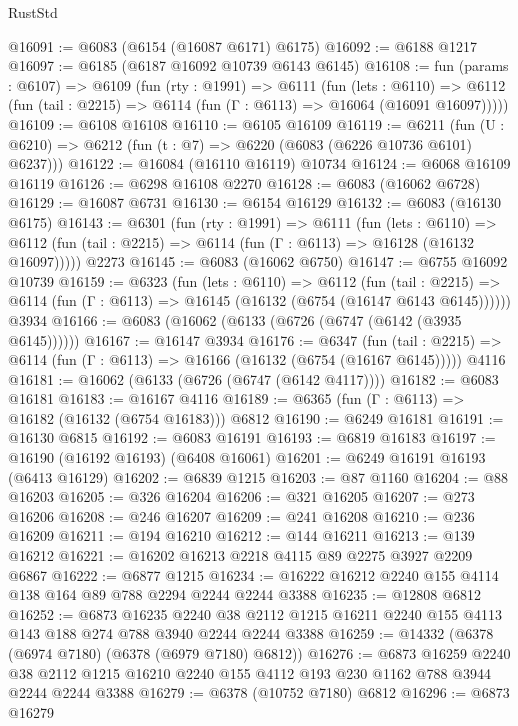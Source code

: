 \begin{lexlean}{RustStd}
\begin{coremodule}
@16091 := @6083 (@6154 (@16087 @6171) @6175)
@16092 := @6188 @1217
@16097 := @6185 (@6187 @16092 @10739 @6143 @6145)
@16108 := fun (params : @6107) =>
  @6109
    (fun (rty : @1991) =>
    @6111
      (fun (lets : @6110) =>
      @6112 (fun (tail : @2215) => @6114 (fun (Γ : @6113) => @16064 (@16091 @16097)))))
@16109 := @6108 @16108
@16110 := @6105 @16109
@16119 := @6211
    (fun (U : @6210) => @6212 (fun (t : @7) => @6220 (@6083 (@6226 @10736 @6101) @6237)))
@16122 := @16084 (@16110 @16119) @10734
@16124 := @6068 @16109 @16119
@16126 := @6298 @16108 @2270
@16128 := @6083 (@16062 @6728)
@16129 := @16087 @6731
@16130 := @6154 @16129
@16132 := @6083 (@16130 @6175)
@16143 := @6301
    (fun (rty : @1991) =>
    @6111
      (fun (lets : @6110) =>
      @6112 (fun (tail : @2215) => @6114 (fun (Γ : @6113) => @16128 (@16132 @16097)))))
    @2273
@16145 := @6083 (@16062 @6750)
@16147 := @6755 @16092 @10739
@16159 := @6323
    (fun (lets : @6110) =>
    @6112
      (fun (tail : @2215) =>
      @6114 (fun (Γ : @6113) => @16145 (@16132 (@6754 (@16147 @6143 @6145))))))
    @3934
@16166 := @6083 (@16062 (@6133 (@6726 (@6747 (@6142 (@3935 @6145))))))
@16167 := @16147 @3934
@16176 := @6347
    (fun (tail : @2215) => @6114 (fun (Γ : @6113) => @16166 (@16132 (@6754 (@16167 @6145)))))
    @4116
@16181 := @16062 (@6133 (@6726 (@6747 (@6142 @4117))))
@16182 := @6083 @16181
@16183 := @16167 @4116
@16189 := @6365 (fun (Γ : @6113) => @16182 (@16132 (@6754 @16183))) @6812
@16190 := @6249 @16181
@16191 := @16130 @6815
@16192 := @6083 @16191
@16193 := @6819 @16183
@16197 := @16190 (@16192 @16193) (@6408 @16061)
@16201 := @6249 @16191 @16193 (@6413 @16129)
@16202 := @6839 @1215
@16203 := @87 @1160
@16204 := @88 @16203
@16205 := @326 @16204
@16206 := @321 @16205
@16207 := @273 @16206
@16208 := @246 @16207
@16209 := @241 @16208
@16210 := @236 @16209
@16211 := @194 @16210
@16212 := @144 @16211
@16213 := @139 @16212
@16221 := @16202 @16213 @2218 @4115 @89 @2275 @3927 @2209 @6867
@16222 := @6877 @1215
@16234 := @16222 @16212 @2240 @155 @4114 @138 @164 @89 @788 @2294 @2244 @2244 @3388
@16235 := @12808 @6812
@16252 := @6873
    @16235
    @2240
    @38
    @2112
    @1215
    @16211
    @2240
    @155
    @4113
    @143
    @188
    @274
    @788
    @3940
    @2244
    @2244
    @3388
@16259 := @14332 (@6378 (@6974 @7180) (@6378 (@6979 @7180) @6812))
@16276 := @6873
    @16259
    @2240
    @38
    @2112
    @1215
    @16210
    @2240
    @155
    @4112
    @193
    @230
    @1162
    @788
    @3944
    @2244
    @2244
    @3388
@16279 := @6378 (@10752 @7180) @6812
@16296 := @6873
    @16279

\end{coremodule}
\end{lexlean}
